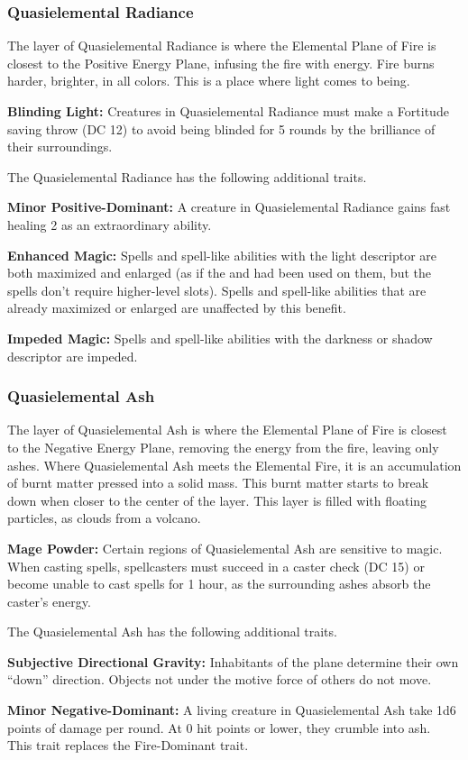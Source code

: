 \subsubsection{Quasielemental Radiance}
The layer of Quasielemental Radiance is where the Elemental Plane of Fire is closest to the Positive Energy Plane, infusing the fire with energy. Fire burns harder, brighter, in all colors. This is a place where light comes to being.

\textbf{Blinding Light:} Creatures in Quasielemental Radiance must make a Fortitude saving throw (DC 12) to avoid being blinded for 5 rounds by the brilliance of their surroundings.

The Quasielemental Radiance has the following additional traits.
\begin{itemize*}
\item \textbf{Minor Positive-Dominant:} A creature in Quasielemental Radiance gains fast healing 2 as an extraordinary ability.
\item \textbf{Enhanced Magic:} Spells and spell-like abilities with the light descriptor are both maximized and enlarged (as if the  and  had been used on them, but the spells don't require higher-level slots). Spells and spell-like abilities that are already maximized or enlarged are unaffected by this benefit.
\item \textbf{Impeded Magic:} Spells and spell-like abilities with the darkness or shadow descriptor are impeded.
\end{itemize*}

\subsubsection{Quasielemental Ash}
The layer of Quasielemental Ash is where the Elemental Plane of Fire is closest to the Negative Energy Plane, removing the energy from the fire, leaving only ashes. Where Quasielemental Ash meets the Elemental Fire, it is an accumulation of burnt matter pressed into a solid mass. This burnt matter starts to break down when closer to the center of the layer. This layer is filled with floating particles, as clouds from a volcano.

\textbf{Mage Powder:} Certain regions of Quasielemental Ash are sensitive to magic. When casting spells, spellcasters must succeed in a caster check (DC 15) or become unable to cast spells for 1 hour, as the surrounding ashes absorb the caster's energy.

The Quasielemental Ash has the following additional traits.
\begin{itemize*}
\item \textbf{Subjective Directional Gravity:} Inhabitants of the plane determine their own ``down'' direction. Objects not under the motive force of others do not move.

\item \textbf{Minor Negative-Dominant:} A living creature in Quasielemental Ash take 1d6 points of damage per round. At 0 hit points or lower, they crumble into ash.\\

This trait replaces the Fire-Dominant trait.
\end{itemize*}
